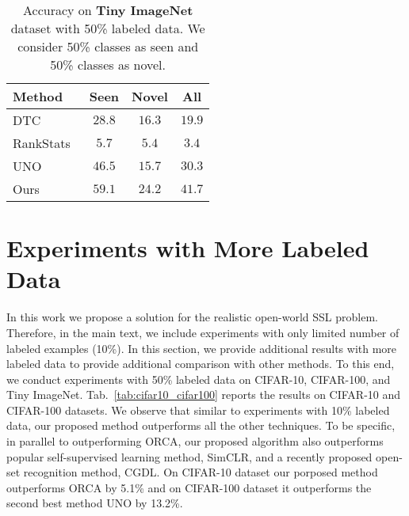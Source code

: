 \documentclass[runningheads]{eccv2022submission}
\begin{document}
\begin{table}[h]
\caption{Accuracy on \textbf{Tiny ImageNet}  dataset with  50\% labeled data. We consider 50\% classes as seen and 50\% classes as novel.}
\label{tab:cifar100}
\begin{center}\setlength{\tabcolsep}{4pt}
\small
\begin{tabular}{lccc}
\hline

\textbf{Method}  & \textbf{Seen} & \textbf{Novel} & \textbf{All}\\




\hline
DTC~\cite{han2019learning} & $28.8$ & $16.3$ & $19.9$\\
RankStats~\cite{Han2020Automatically} &$5.7$ & $5.4$ & $3.4$\\
UNO~\cite{fini2021unified} &  $46.5$ & $15.7$ & $30.3$\\
Ours & {\cellcolor{yellow!15}}${59.1}$ & {\cellcolor{yellow!15}}${24.2}$ & {\cellcolor{yellow!15}}${41.7}$\\\hline 



\end{tabular}
\end{center}
\vspace{-4mm}

\end{table}


\section{Experiments with More Labeled Data}
\label{sec:morelabeled}
In this work we propose a solution for the realistic open-world SSL problem. Therefore, in the main text, we include experiments with only limited number of labeled examples (10\%). In this section, we provide additional results with more labeled data to provide additional comparison with other methods. To this end, we conduct experiments with 50\% labeled data on CIFAR-10, CIFAR-100, and Tiny ImageNet. Tab.~\ref{tab:cifar10_cifar100} reports the results on CIFAR-10 and CIFAR-100 datasets. We observe that similar to experiments with 10\% labeled data, our proposed method outperforms all the other techniques. To be specific, in parallel to outperforming ORCA\cite{cao2022openworld}, our proposed algorithm also outperforms popular self-supervised learning method, SimCLR\cite{chen2020simple}, and a recently proposed open-set recognition method, CGDL\cite{sun2020conditional}. On CIFAR-10 dataset our porposed method outperforms ORCA\cite{cao2022openworld} by 5.1\% and on CIFAR-100 dataset it outperforms the second best method UNO\cite{fini2021unified} by 13.2\%.
\end{document}
